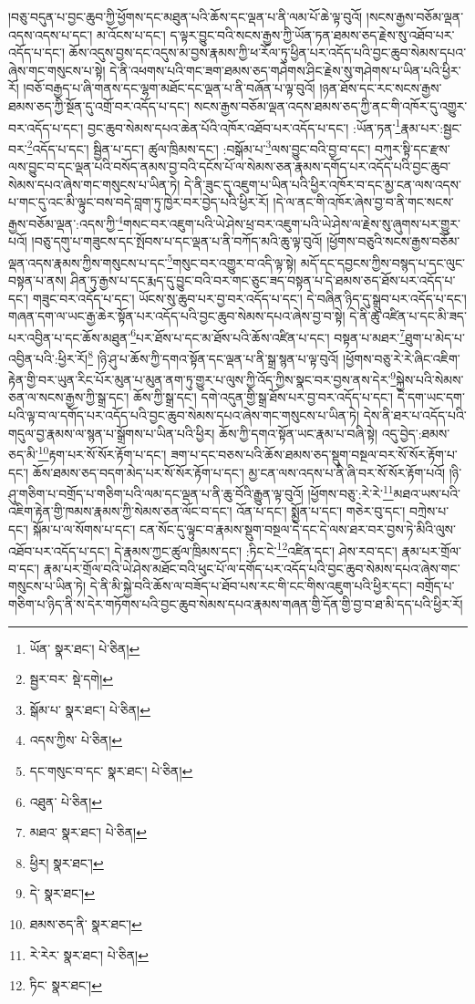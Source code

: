 །བཅུ་བདུན་པ་བྱང་ཆུབ་ཀྱི་ཕྱོགས་དང་མཐུན་པའི་ཆོས་དང་ལྡན་པ་ནི་ལམ་པོ་ཆེ་ལྟ་བུའོ། །སངས་རྒྱས་བཅོམ་ལྡན་འདས་འདས་པ་དང་། མ་འོངས་པ་དང་། ད་ལྟར་བྱུང་བའི་སངས་རྒྱས་ཀྱི་ཡོན་ཏན་ཐམས་ཅད་རྗེས་སུ་འཐོབ་པར་འདོད་པ་དང་། ཆོས་འདུས་བྱས་དང་འདུས་མ་བྱས་རྣམས་ཀྱི་ཕ་རོལ་ཏུ་ཕྱིན་པར་འདོད་པའི་བྱང་ཆུབ་སེམས་དཔའ་ཞེས་གང་གསུངས་པ་སྟེ། དེ་ནི་འཕགས་པའི་གང་ཟག་ཐམས་ཅད་གཤེགས་ཤིང་རྗེས་སུ་གཤེགས་པ་ཡིན་པའི་ཕྱིར་རོ། །བཅོ་བརྒྱད་པ་ཞི་གནས་དང་ལྷག་མཐོང་དང་ལྡན་པ་ནི་བཞོན་པ་ལྟ་བུའོ། །ཉན་ཐོས་དང་རང་སངས་རྒྱས་ཐམས་ཅད་ཀྱི་སྔོན་དུ་འགྲོ་བར་འདོད་པ་དང་། སངས་རྒྱས་བཅོམ་ལྡན་འདས་ཐམས་ཅད་ཀྱི་ནང་གི་འཁོར་དུ་འགྱུར་བར་འདོད་པ་དང་། བྱང་ཆུབ་སེམས་དཔའ་ཆེན་པོའི་འཁོར་འཐོབ་པར་འདོད་པ་དང་། :ཡོན་ཏན་\footnote{ཡོན་  སྣར་ཐང་།  པེ་ཅིན། }རྣམ་པར་:སྦྱང་བར་\footnote{སྦྱར་བར་  སྡེ་དགེ། }འདོད་པ་དང་། སྦྱིན་པ་དང་། ཚུལ་ཁྲིམས་དང་། :བསྒོམ་པ་\footnote{སྒོམ་པ་  སྣར་ཐང་།  པེ་ཅིན། }ལས་བྱུང་བའི་བྱ་བ་དང་། བཀུར་སྟི་དང་རྫས་ལས་བྱུང་བ་དང་ལྡན་པའི་བསོད་ནམས་བྱ་བའི་དངོས་པོ་ལ་སེམས་ཅན་རྣམས་དགོད་པར་འདོད་པའི་བྱང་ཆུབ་སེམས་དཔའ་ཞེས་གང་གསུངས་པ་ཡིན་ཏེ། དེ་ནི་ཟུང་དུ་འཇུག་པ་ཡིན་པའི་ཕྱིར་འཁོར་བ་དང་མྱ་ངན་ལས་འདས་པ་གང་དུ་འང་མི་ལྟུང་བས་བདེ་བླག་ཏུ་ཁྱེར་བར་བྱེད་པའི་ཕྱིར་རོ། །དེ་ལ་ནང་གི་འཁོར་ཞེས་བྱ་བ་ནི་གང་སངས་རྒྱས་བཅོམ་ལྡན་:འདས་ཀྱི་\footnote{འདས་ཀྱིས་  པེ་ཅིན། }གསང་བར་འཇུག་པའི་ཡེ་ཤེས་ཕྲ་བར་འཇུག་པའི་ཡེ་ཤེས་ལ་རྗེས་སུ་ཞུགས་པར་གྱུར་པའོ། །བཅུ་དགུ་པ་གཟུངས་དང་སྤོབས་པ་དང་ལྡན་པ་ནི་བཀོད་མའི་ཆུ་ལྟ་བུའོ། །ཕྱོགས་བཅུའི་སངས་རྒྱས་བཅོམ་ལྡན་འདས་རྣམས་ཀྱིས་གསུངས་པ་དང་\footnote{དང་གསུང་བ་དང་  སྣར་ཐང་།  པེ་ཅིན། }གསུང་བར་འགྱུར་བ་འདི་ལྟ་སྟེ། མདོ་དང་དབྱངས་ཀྱིས་བསྙད་པ་དང་ལུང་བསྟན་པ་ནས། ཤིན་ཏུ་རྒྱས་པ་དང་རྨད་དུ་བྱུང་བའི་བར་གང་ཅུང་ཟད་བསྟན་པ་དེ་ཐམས་ཅད་ཐོས་པར་འདོད་པ་དང་། གཟུང་བར་འདོད་པ་དང་། ཡོངས་སུ་ཆུབ་པར་བྱ་བར་འདོད་པ་དང་། དེ་བཞིན་ཉིད་དུ་སྒྲུབ་པར་འདོད་པ་དང་། གཞན་དག་ལ་ཡང་རྒྱ་ཆེར་སྟོན་པར་འདོད་པའི་བྱང་ཆུབ་སེམས་དཔའ་ཞེས་བྱ་བ་སྟེ། དེ་ནི་ཆུ་འཛིན་པ་དང་མི་ཟད་པར་འབྱིན་པ་དང་ཆོས་མཐུན་\footnote{འཐུན་  པེ་ཅིན། }པར་ཐོས་པ་དང་མ་ཐོས་པའི་ཆོས་འཛིན་པ་དང་། བསྟན་པ་མཐར་\footnote{མཐའ་  སྣར་ཐང་།  པེ་ཅིན། }ཐུག་པ་མེད་པ་འབྱིན་པའི་:ཕྱིར་རོ།\footnote{ཕྱིར།  སྣར་ཐང་། } །ཉི་ཤུ་པ་ཆོས་ཀྱི་དགའ་སྟོན་དང་ལྡན་པ་ནི་སྒྲ་སྙན་པ་ལྟ་བུའོ། །ཕྱོགས་བཅུ་རེ་རེ་ཞིང་འཇིག་རྟེན་གྱི་བར་ཡུན་རིང་པོར་མུན་པ་མུན་ནག་ཏུ་གྱུར་པ་ལུས་ཀྱི་འོད་ཀྱིས་སྣང་བར་བྱས་ནས་དེར་\footnote{དེ་  སྣར་ཐང་། }སྐྱེས་པའི་སེམས་ཅན་ལ་སངས་རྒྱས་ཀྱི་སྒྲ་དང་། ཆོས་ཀྱི་སྒྲ་དང་། དགེ་འདུན་གྱི་སྒྲ་ཐོས་པར་བྱ་བར་འདོད་པ་དང་། དེ་དག་ཡང་དག་པའི་ལྟ་བ་ལ་དགོད་པར་འདོད་པའི་བྱང་ཆུབ་སེམས་དཔའ་ཞེས་གང་གསུངས་པ་ཡིན་ཏེ། དེས་ནི་ཐར་པ་འདོད་པའི་གདུལ་བྱ་རྣམས་ལ་སྙན་པ་སྒྲོགས་པ་ཡིན་པའི་ཕྱིར། ཆོས་ཀྱི་དགའ་སྟོན་ཡང་རྣམ་པ་བཞི་སྟེ། འདུ་བྱེད་:ཐམས་ཅད་མི་\footnote{ཐམས་ཅད་ནི་  སྣར་ཐང་། }རྟག་པར་སོ་སོར་རྟོག་པ་དང་། ཟག་པ་དང་བཅས་པའི་ཆོས་ཐམས་ཅད་སྡུག་བསྔལ་བར་སོ་སོར་རྟོག་པ་དང་། ཆོས་ཐམས་ཅད་བདག་མེད་པར་སོ་སོར་རྟོག་པ་དང་། མྱ་ངན་ལས་འདས་པ་ནི་ཞི་བར་སོ་སོར་རྟོག་པའོ། །ཉི་ཤུ་གཅིག་པ་བགྲོད་པ་གཅིག་པའི་ལམ་དང་ལྡན་པ་ནི་ཆུ་བོའི་རྒྱུན་ལྟ་བུའོ། །ཕྱོགས་བཅུ་:རེ་རེ་\footnote{རེ་རེར་  སྣར་ཐང་།  པེ་ཅིན། }མཐའ་ཡས་པའི་འཇིག་རྟེན་གྱི་ཁམས་རྣམས་ཀྱི་སེམས་ཅན་ལོང་བ་དང་། འོན་པ་དང་། སྨྱོན་པ་དང་། གཅེར་བུ་དང་། བཀྲེས་པ་དང་། སྐོམ་པ་ལ་སོགས་པ་དང་། ངན་སོང་དུ་ལྟུང་བ་རྣམས་སྡུག་བསྔལ་དེ་དང་དེ་ལས་ཐར་བར་བྱས་ཏེ་མིའི་ལུས་འཐོབ་པར་འདོད་པ་དང་། དེ་རྣམས་ཀྱང་ཚུལ་ཁྲིམས་དང་། :ཏིང་ངེ་\footnote{ཏིང་  སྣར་ཐང་། }འཛིན་དང་། ཤེས་རབ་དང་། རྣམ་པར་གྲོལ་བ་དང་། རྣམ་པར་གྲོལ་བའི་ཡེ་ཤེས་མཐོང་བའི་ཕུང་པོ་ལ་དགོད་པར་འདོད་པའི་བྱང་ཆུབ་སེམས་དཔའ་ཞེས་གང་གསུངས་པ་ཡིན་ཏེ། དེ་ནི་མི་སྐྱེ་བའི་ཆོས་ལ་བཟོད་པ་ཐོབ་པས་རང་གི་ངང་གིས་འཇུག་པའི་ཕྱིར་དང་། བགྲོད་པ་གཅིག་པ་ཉིད་ནི་ས་དེར་གཏོགས་པའི་བྱང་ཆུབ་སེམས་དཔའ་རྣམས་གཞན་གྱི་དོན་གྱི་བྱ་བ་ཐ་མི་དད་པའི་ཕྱིར་རོ། 